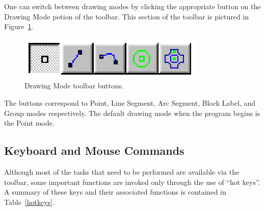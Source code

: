 \documentclass[12pt]{report}
\begin{document}
One can switch between drawing modes by clicking the appropriate
button on the Drawing Mode potion of the toolbar. This section of
the toolbar is pictured in Figure~\ref{modebuttons}.
\begin{figure}[ht]
\centerline{\includegraphics{modebtn.ps}}
\caption{Drawing Mode toolbar buttons.}
\label{modebuttons}
\end{figure}
The buttons correspond to Point, Line Segment, Arc Segment, Block
Label, and Group modes respectively.  The default drawing mode when
the program begins is the Point mode.

\subsection{Keyboard and Mouse Commands}
Although most of the tasks that need to be performed are available
via the toolbar, some important functions are invoked only through
the use of ``hot keys''. A summary of these keys and their
associated functions is contained in Table~\ref{hotkeys}.
\end{document}
